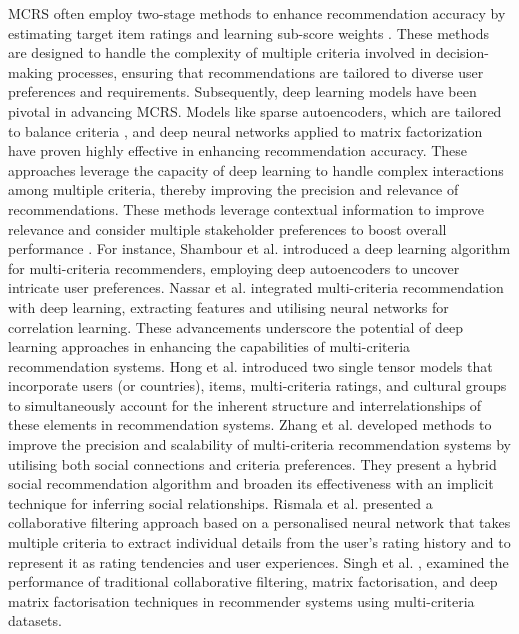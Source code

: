     MCRS often employ two-stage methods to enhance recommendation accuracy by estimating target item ratings and learning sub-score weights \cite{adomavicius2007new, zheng2017criteria, jannach2012accuracy, nassar2020novel, li2019latent}. These methods are designed to handle the complexity of multiple criteria involved in decision-making processes, ensuring that recommendations are tailored to diverse user preferences and requirements. Subsequently, deep learning models have been pivotal in advancing MCRS. Models like sparse autoencoders, which are tailored to balance criteria \cite{kalantarnezhad2022mcrs}, and deep neural networks applied to matrix factorization \cite{sinha2022dnn}  have proven highly effective in enhancing recommendation accuracy. These approaches leverage the capacity of deep learning to handle complex interactions among multiple criteria, thereby improving the precision and relevance of recommendations. These methods leverage contextual information to improve relevance \cite{vu2022deep, krishna2023analysing} and consider multiple stakeholder preferences to boost overall performance \cite{shrivastava2023deep}. For instance, Shambour et al. \cite{shambour2021deep} introduced a deep learning algorithm for multi-criteria recommenders, employing deep autoencoders to uncover intricate user preferences. Nassar et al. \cite{nassar2020multi, nassar2020novel} integrated multi-criteria recommendation with deep learning, extracting features and utilising neural networks for correlation learning. These advancements underscore the potential of deep learning approaches in enhancing the capabilities of multi-criteria recommendation systems. Hong et al. \cite{hong2021multi} introduced two single tensor models that incorporate users (or countries), items, multi-criteria ratings, and cultural groups to simultaneously account for the inherent structure and interrelationships of these elements in recommendation systems. Zhang et al. \cite{ zhang2021multi} developed methods to improve the precision and scalability of multi-criteria recommendation systems by utilising both social connections and criteria preferences. They present a hybrid social recommendation algorithm and broaden its effectiveness with an implicit technique for inferring social relationships. Rismala et al. \cite{rismala2024personalized} presented a collaborative filtering approach based on a personalised neural network that takes multiple criteria to extract individual details from the user's rating history and to represent it as rating tendencies and user experiences. Singh et al. \cite{singh2024comparative}, examined the performance of traditional collaborative filtering, matrix factorisation, and deep matrix factorisation techniques in recommender systems using multi-criteria datasets.
    
